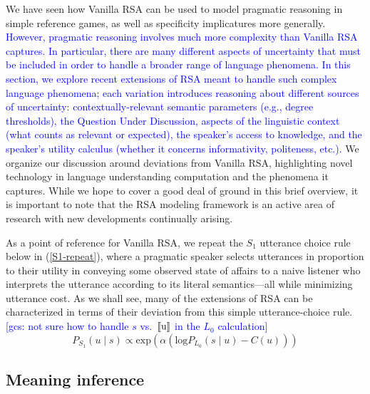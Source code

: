 \documentclass{sp}
\newcommand{\gcs}[1]{\textcolor{blue}{[gcs: #1]}}
\newcommand{\gs}[1]{\textcolor{blue}{#1}}
\newcommand{\sem}[1]{\ensuremath{[\![#1]\!]}}
\begin{document}
We have seen how Vanilla RSA can be used to model pragmatic reasoning in simple reference games, as well as specificity implicatures more generally. \gs{However, pragmatic reasoning involves much more complexity than Vanilla RSA captures. In particular, there are many different aspects of uncertainty that must be included in order to handle a broader range of language phenomena. In this section, we explore recent extensions of RSA meant to handle such complex language phenomena; each variation introduces reasoning about different sources of uncertainty: contextually-relevant semantic parameters (e.g., degree thresholds), the Question Under Discussion, aspects of the linguistic context (what counts as relevant or expected), the speaker's access to knowledge, and the speaker's utility calculus (whether it concerns informativity, politeness, etc.).} We organize our discussion around deviations from Vanilla RSA, highlighting novel technology in language understanding computation and the phenomena it captures. While we hope to cover a good deal of ground in this brief overview, it is important to note that the RSA modeling framework is an active area of research with new developments continually arising.

As a point of reference for Vanilla RSA, we repeat the $S_1$ utterance choice rule below in (\ref{S1-repeat}), where a pragmatic speaker selects utterances in proportion to their utility in conveying some observed state of affairs to a naive listener who interprets the utterance according to its literal semantics---all while minimizing utterance cost. As we shall see, many of the extensions of RSA can be characterized in terms of their deviation from this simple utterance-choice rule. \gcs{not sure how to handle $s$ vs.~\sem{$u$} in the $L_0$ calculation}
\begin{equation} \label{S1-repeat}
P_{S_1}(u\mid s) \propto \textrm{exp}(\alpha (\textrm{log}P_{L_0}(s\mid u) - C(u)))
\end{equation}

\subsection{Meaning inference} \label{meaning-inference}
\end{document}
